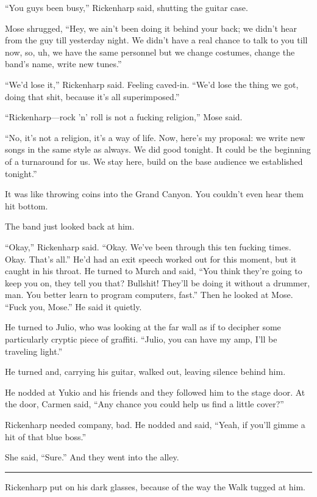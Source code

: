 ``You guys been busy,'' Rickenharp said, shutting the guitar case.

Mose shrugged, ``Hey, we ain't been doing it behind your back; we didn't hear from the guy till yesterday night. We didn't have a real chance to talk to you till now, so, uh, we have the same personnel but we change costumes, change the band's name, write new tunes.''

``We'd lose it,'' Rickenharp said. Feeling caved-in. ``We'd lose the thing we got, doing that shit, because it's all superimposed.''

``Rickenharp—rock 'n' roll is not a fucking religion,'' Mose said.

``No, it's not a religion, it's a way of life. Now, here's my proposal: we write new songs in the same style as always. We did good tonight. It could be the beginning of a turnaround for us. We stay here, build on the base audience we established tonight.''

It was like throwing coins into the Grand Canyon. You couldn't even hear them hit bottom.

The band just looked back at him.

``Okay,'' Rickenharp said. ``Okay. We've been through this ten fucking times. Okay. That's all.'' He'd had an exit speech worked out for this moment, but it caught in his throat. He turned to Murch and said, ``You think they're going to keep you on, they tell you that? Bullshit! They'll be doing it without a drummer, man. You better learn to program computers, fast.'' Then he looked at Mose. ``Fuck you, Mose.'' He said it quietly.

He turned to Julio, who was looking at the far wall as if to decipher some particularly cryptic piece of graffiti. ``Julio, you can have my amp, I'll be traveling light.''

He turned and, carrying his guitar, walked out, leaving silence behind him.

He nodded at Yukio and his friends and they followed him to the stage door. At the door, Carmen said, ``Any chance you could help us find a little cover?''

Rickenharp needed company, bad. He nodded and said, ``Yeah, if you'll gimme a hit of that blue boss.''

She said, ``Sure.'' And they went into the alley.

\fancybreak{* * *}

Rickenharp put on his dark glasses, because of the way the Walk tugged at him.

